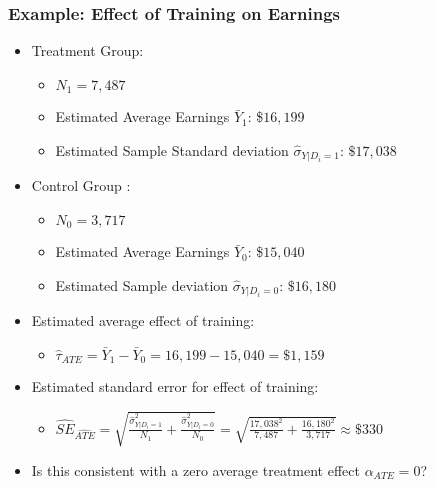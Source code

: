 \documentclass{beamer}
\numberwithin{equation}{section}
\begin{document}
\begin{frame}
  \frametitle{Example: Effect of Training on Earnings}
\small
\begin{itemize}
  \item Treatment Group:
  \begin{itemize}
  \item $N_1=7,487$
    \item Estimated Average Earnings $\bar{Y}_1$: \$$16,199$
    \item Estimated Sample Standard deviation $\widehat{\sigma}_{Y|D_i=1}$: $\$17,038$
  \end{itemize}\smallskip

  \item Control Group :
  \begin{itemize}
  \item $N_0=3,717$
    \item Estimated Average Earnings $\bar{Y}_0$: \$$15,040$
    \item Estimated Sample  deviation $\widehat{\sigma}_{Y|D_i=0}$: $\$16,180$
  \end{itemize}\smallskip
  \item Estimated average effect of training: \pause
  \begin{itemize}
    \item $\widehat{\tau}_{ATE} = \bar{Y}_1 - \bar{Y}_0 = 16,199 - 15,040 = \$1,159$
  \end{itemize}\smallskip
  \item Estimated standard error for effect of training: \pause
  \begin{itemize}
    \item $\widehat{ SE}_{\widehat{ATE}} = \sqrt{ \frac{ \widehat{\sigma}^2_{Y|D_i=1}  }{N_1}+ \frac{ \widehat{\sigma}^2_{Y|D_i=0} }{N_0}} = \sqrt{\frac{17,038^2}{7,487}+ \frac{16,180^2}{3,717} }\approx\$330$
  \end{itemize}\smallskip
  \item Is this consistent with a zero average treatment effect $\alpha_{ATE}=0$?
\end{itemize}

\end{frame}
\end{document}
